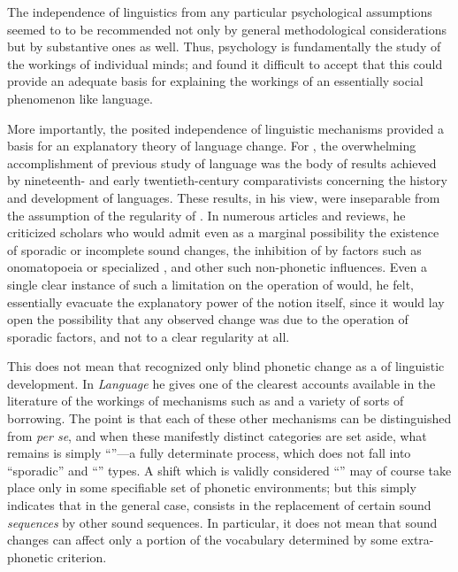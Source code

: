 The independence of linguistics from any particular psychological
assumptions seemed to {\Bloomfield} to be recommended not only by general
methodological considerations but by substantive ones as well. Thus,
psychology is fundamentally the study of the workings of individual
minds; and {\Bloomfield} found it difficult to accept that this could
provide an adequate basis for explaining the workings of an
essentially social phenomenon like language.

More importantly, the posited independence of linguistic mechanisms
provided a basis for an explanatory theory of language change. For
{\Bloomfield}, the overwhelming accomplishment of previous study of
language was the body of results achieved by nineteenth- and early
twentieth-century comparativists concerning the history and
development of languages. These results, in his view, were inseparable
from the assumption of the regularity of . In numerous
articles and reviews, he criticized scholars who would admit even as a
marginal possibility the existence of sporadic or incomplete sound
changes, the inhibition of  by factors such as
onomatopoeia or specialized , and other such non-phonetic
influences. Even a single clear instance of such a limitation on the
operation of  would, he felt, essentially evacuate the
explanatory power of the notion itself, since it would lay open the
possibility that any observed change was due to the operation of
sporadic factors, and not to a clear regularity at all.

This does not mean that {\Bloomfield} recognized only blind phonetic
change as a  of linguistic development. In \textsl{Language}
he gives one of the clearest accounts available in the literature of
the workings of mechanisms such as  and a variety of sorts of
borrowing. The point is that each of these other mechanisms can be
distinguished from  \emph{per se}, and when these
manifestly distinct categories are set aside, what remains is simply
``''—a fully determinate process, which does not fall into
``sporadic'' and ``'' types. A shift which is validly considered
``'' may of course take place only in some specifiable set
of phonetic environments; but this simply indicates that in the
general case,  consists in the replacement of certain
sound \emph{sequences} by other sound sequences. In particular, it
does not mean that sound changes can affect only a portion of the
vocabulary determined by some extra-phonetic criterion.

